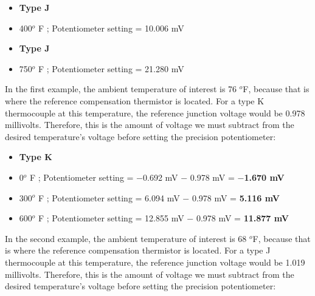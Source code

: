 \vskip 10pt

\begin{itemize}
\item{} {\bf Type J}
\item{} 400$^{o}$ F ; Potentiometer setting = 10.006 mV 
\end{itemize}

\vskip 10pt

\begin{itemize}
\item{} {\bf Type J}
\item{} 750$^{o}$ F ; Potentiometer setting = 21.280 mV
\end{itemize}







In the first example, the ambient temperature of interest is 76 $^{o}$F, because that is where the reference compensation thermistor is located.  For a type K thermocouple at this temperature, the reference junction voltage would be 0.978 millivolts.  Therefore, this is the amount of voltage we must subtract from the desired temperature's voltage before setting the precision potentiometer:

\begin{itemize}
\item{} {\bf Type K}
\item{} 0$^{o}$ F ; Potentiometer setting = $-$0.692 mV $-$ 0.978 mV = {\bf $-$1.670 mV}
\item{} 300$^{o}$ F ; Potentiometer setting = 6.094 mV $-$ 0.978 mV = {\bf 5.116 mV} 
\item{} 600$^{o}$ F ; Potentiometer setting = 12.855 mV $-$ 0.978 mV = {\bf 11.877 mV}
\end{itemize}

\vskip 10pt

In the second example, the ambient temperature of interest is 68 $^{o}$F, because that is where the reference compensation thermistor is located.  For a type J thermocouple at this temperature, the reference junction voltage would be 1.019 millivolts.  Therefore, this is the amount of voltage we must subtract from the desired temperature's voltage before setting the precision potentiometer:

